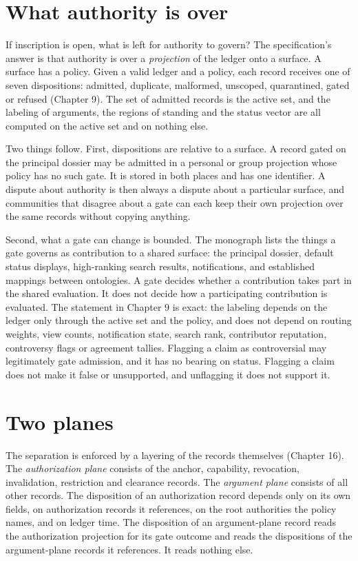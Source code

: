 \documentclass[11pt]{article}
\begin{document}
\section{What authority is over}\label{sec:over}

If inscription is open, what is left for authority to govern? The specification's answer is that authority is over a \emph{projection} of the ledger onto a surface. A surface has a policy. Given a valid ledger and a policy, each record receives one of seven dispositions: admitted, duplicate, malformed, unscoped, quarantined, gated or refused (Chapter 9). The set of admitted records is the active set, and the labeling of arguments, the regions of standing and the status vector are all computed on the active set and on nothing else.

Two things follow. First, dispositions are relative to a surface. A record gated on the principal dossier may be admitted in a personal or group projection whose policy has no such gate. It is stored in both places and has one identifier. A dispute about authority is then always a dispute about a particular surface, and communities that disagree about a gate can each keep their own projection over the same records without copying anything.

Second, what a gate can change is bounded. The monograph lists the things a gate governs as contribution to a shared surface: the principal dossier, default status displays, high-ranking search results, notifications, and established mappings between ontologies. A gate decides whether a contribution takes part in the shared evaluation. It does not decide how a participating contribution is evaluated. The statement in Chapter 9 is exact: the labeling depends on the ledger only through the active set and the policy, and does not depend on routing weights, view counts, notification state, search rank, contributor reputation, controversy flags or agreement tallies. Flagging a claim as controversial may legitimately gate admission, and it has no bearing on status. Flagging a claim does not make it false or unsupported, and unflagging it does not support it.

\section{Two planes}\label{sec:planes}

The separation is enforced by a layering of the records themselves (Chapter 16). The \emph{authorization plane} consists of the anchor, capability, revocation, invalidation, restriction and clearance records. The \emph{argument plane} consists of all other records. The disposition of an authorization record depends only on its own fields, on authorization records it references, on the root authorities the policy names, and on ledger time. The disposition of an argument-plane record reads the authorization projection for its gate outcome and reads the dispositions of the argument-plane records it references. It reads nothing else.
\end{document}

